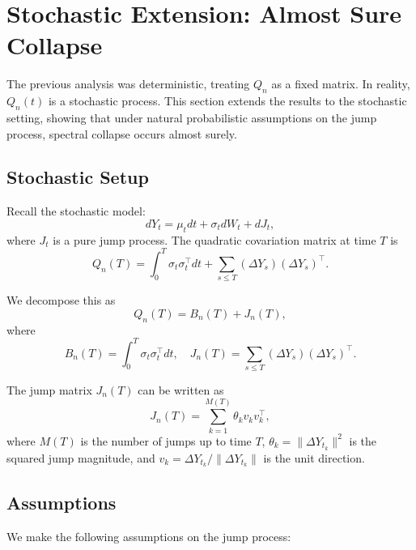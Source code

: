 \documentclass{article}
\begin{document}
\section{Stochastic Extension: Almost Sure Collapse}

The previous analysis was deterministic, treating \(Q_n\) as a fixed matrix. In reality, \(Q_n(t)\) is a stochastic process. This section extends the results to the stochastic setting, showing that under natural probabilistic assumptions on the jump process, spectral collapse occurs almost surely.

\subsection{Stochastic Setup}

Recall the stochastic model:
\[
dY_t = \mu_t dt + \sigma_t dW_t + dJ_t,
\]
where \(J_t\) is a pure jump process. The quadratic covariation matrix at time \(T\) is
\[
Q_n(T) = \int_0^T \sigma_t \sigma_t^\top dt + \sum_{s \le T} (\Delta Y_s)(\Delta Y_s)^\top.
\]

We decompose this as
\[
Q_n(T) = B_n(T) + J_n(T),
\]
where
\[
B_n(T) = \int_0^T \sigma_t \sigma_t^\top dt, \quad J_n(T) = \sum_{s \le T} (\Delta Y_s)(\Delta Y_s)^\top.
\]

The jump matrix \(J_n(T)\) can be written as
\[
J_n(T) = \sum_{k=1}^{M(T)} \theta_k v_k v_k^\top,
\]
where \(M(T)\) is the number of jumps up to time \(T\), \(\theta_k = \|\Delta Y_{t_k}\|^2\) is the squared jump magnitude, and \(v_k = \Delta Y_{t_k}/\|\Delta Y_{t_k}\|\) is the unit direction.

\subsection{Assumptions}

We make the following assumptions on the jump process:
\end{document}
